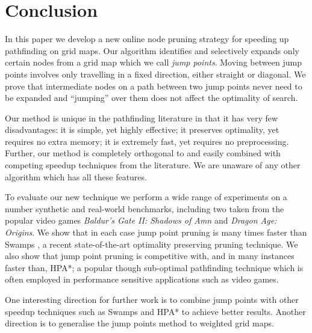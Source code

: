 \section{Conclusion}
In this paper we develop a new online node pruning strategy for speeding up
pathfinding on grid maps.  Our algorithm identifies and selectively expands only
certain nodes from a grid map which we call \emph{jump points}.  Moving between
jump points involves only travelling in a fixed direction, either straight or
diagonal.  We prove that intermediate nodes on a path between two jump points
never need to be expanded and ``jumping'' over them does not affect the
optimality of search.
\par
Our method is unique in the pathfinding literature in that it has very few
disadvantages: it is simple, yet highly effective; it preserves optimality, yet
requires no extra memory;  it is extremely fast, yet requires no preprocessing.
Further, our method is completely orthogonal to and easily combined with 
competing speedup techniques from the literature.
We are unaware of any other algorithm which has all these features.
\par
To evaluate our new technique we perform a wide range of experiments on a number
synthetic and real-world benchmarks, including two taken from the popular video
games \emph{Baldur's Gate II: Shadows of Amn} and \emph{Dragon Age: Origins}.
We show that in each case jump point pruning is many times faster than Swamps
\cite{pochter10}, a recent state-of-the-art optimality preserving pruning
technique.  We also show that jump point pruning is competitive with, and in
many instances faster than, HPA*; a popular though sub-optimal pathfinding
technique which is often employed in performance sensitive applications such as
video games.
\par
One interesting direction for further work is to combine jump points with other
speedup techniques such as Swamps and HPA* to achieve better results.
Another direction is to generalise the jump points method to weighted grid maps.
